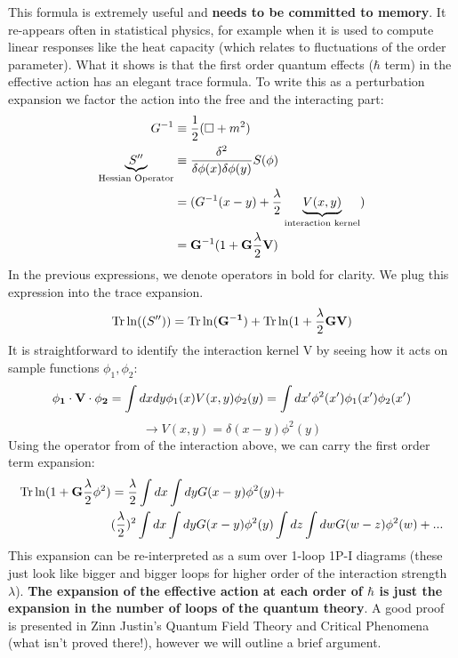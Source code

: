 \documentclass[11pt]{scrartcl}
\begin{document}
This formula is extremely useful and \textbf{needs to be committed to memory}.  It re-appears often in statistical physics,
for example when it is used to compute linear responses like the heat capacity (which relates to fluctuations of the order parameter).
What it shows is that the first order quantum effects ($\hbar$ term)
 in the effective action has an elegant trace formula.  
To write this as a perturbation expansion we factor the action into the free and the interacting part:
\begin{align}
G^{-1} &\equiv {\frac12 (\Box + m^2)} \\
\underbrace{S''}_{\text{Hessian Operator}} &\equiv {\delta^2 \over \delta \phi(x) \delta \phi(y)} S(\phi) \\
 &= (G^{-1}(x-y) + {\lambda \over 2} \underbrace{V(x, y)}_{\text{interaction kernel}}) \\
 &= {\bf G}^{-1} ( 1 + {\bf G} {\lambda \over 2} {\bf V}  )
\end{align}
In the previous expressions, we denote operators in bold for clarity.
We plug this expression into the trace expansion.
\begin{align}
\text{Tr} \ln((S'')) & = \text{Tr} \ln ({\bf G^{-1}}) + \text{Tr} \ln(1 + {\lambda \over 2}{\bf G V})\\
\end{align}
It is straightforward to identify the interaction kernel V by seeing how it acts on sample functions $\phi_1, \phi_2$:
$$ {\bf \phi_1 \cdot  V \cdot \phi_2} = \int dx dy \phi_1(x) V(x, y) \phi_2(y) = \int dx' \phi^2(x') \phi_1(x') \phi_2(x')$$
$$ \rightarrow V(x, y) = \delta(x -y) \phi^2(y)$$
Using the operator from of the interaction above, we can carry the first order term expansion:
\begin{align}
\text{Tr} \ln(1 + {\bf G} {\lambda \over 2} \phi^2) & = {\lambda \over 2} \int dx \int dy G(x-y) \phi^2(y)  + \\
& ({\lambda \over 2})^2 \int dx \int dy G(x-y) \phi^2(y) \int dz \int dw G(w - z) \phi^2(w) + ...  \\
\end{align}
This expansion can be re-interpreted as a sum over 1-loop 1P-I diagrams (these just look like bigger and bigger loops for higher order of
the interaction strength $\lambda$).
\textbf{ The expansion of the effective action at each order of $\hbar$ is just the expansion in the number of loops of the quantum theory}.  A good proof is presented in Zinn Justin's Quantum Field Theory and Critical Phenomena (what isn't proved there!), however we will outline a brief argument.
\end{document}
